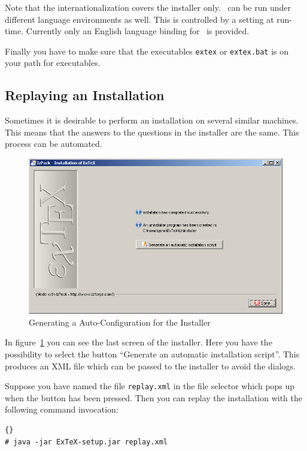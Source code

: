 \documentclass{extex-doc}
\newcommand\Prog[1]{\texttt{#1}\index{#1}}
\begin{document}
Note that the internationalization covers the installer only. \ExTeX\
can be run under different language environments as well. This is
controlled by a setting at run-time. Currently only an English
language binding for \ExTeX\ is provided.

Finally you have to make sure that the executables \Prog{extex} or
\Prog{extex.bat} is on your path for executables.\index{path}


\subsection{Replaying an Installation}

Sometimes it is desirable to perform an installation on several
similar machines. This means that the answers to the questions in the
installer are the same. This process can be automated.
\begin{figure}[tp]
  \centering
  \includegraphics[width=.8\textwidth]{image/inst8}
  \caption{Generating a Auto-Configuration for the Installer}
  \label{fig:inst8}
\end{figure}

In figure~\ref{fig:inst8} you can see the last screen of the
installer. Here you have the possibility to select the button
``Generate an automatic installation script''. This produces an XML
file which can be passed to the installer to avoid the
dialogs.

Suppose you have named the file \texttt{replay.xml} in the file
selector which pops up when the button has been pressed. Then you can
replay the installation with the following command invocation:

\begin{lstlisting}{}
# java -jar ExTeX-setup.jar replay.xml
\end{lstlisting}
\end{document}
